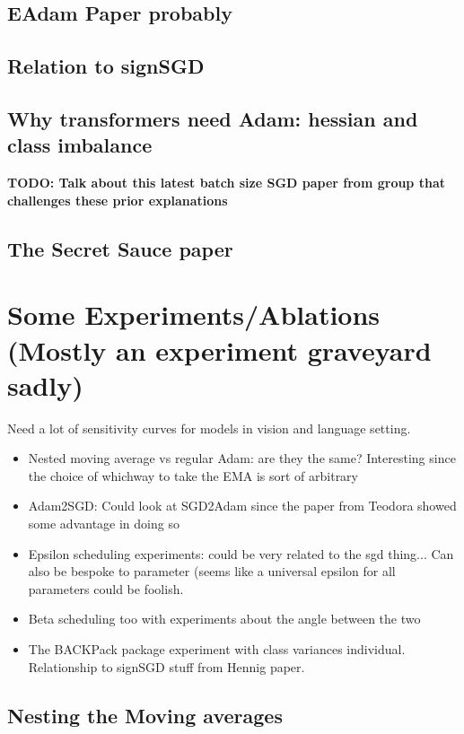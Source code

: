\documentclass[12pt]{book}
\newcommand{\todo}[1]{{\color{red}\bf{TODO: #1}}}
\begin{document}
\subsection{EAdam Paper probably}
\subsection{Relation to signSGD}
\subsection{Why transformers need Adam: hessian and class imbalance}
\todo{Talk about this latest batch size SGD paper from group that challenges these prior explanations}
\subsection{The Secret Sauce paper}

\section{Some Experiments/Ablations (Mostly an experiment graveyard sadly)}
Need a lot of sensitivity curves for models in vision and language setting.
\begin{itemize}
\item Nested moving average vs regular Adam: are they the same? Interesting since the choice of whichway to take the EMA is sort of arbitrary 
\item Adam2SGD: Could look at SGD2Adam since the paper from Teodora showed some advantage in doing so
\item Epsilon scheduling experiments: could be very related to the sgd thing... Can also be bespoke to parameter (seems like a universal epsilon for all parameters could be foolish. 
\item Beta scheduling too with experiments about the angle between the two 
\item The BACKPack package experiment with class variances individual. Relationship to signSGD stuff from Hennig paper.
\end{itemize}
\subsection{}
\subsection{Nesting the Moving averages}
\end{document}
